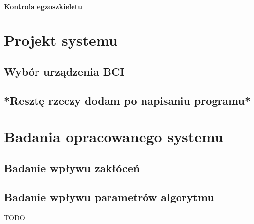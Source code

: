 \documentclass[skorowidz,skroty]{dyplomWEZUT}
\begin{document}
\subsubsection{Kontrola egzoszkieletu}

\chapter{Projekt systemu}
\section{Wybór urządzenia BCI}
\section{*Resztę rzeczy dodam po napisaniu programu*}

\chapter{Badania opracowanego systemu}
\section{Badanie wpływu zakłóceń}
\section{Badanie wpływu parametrów algorytmu}



\begin{zakonczenie}\label{chap:zakonczenie}
TODO
\end{zakonczenie}

\printbibliography[heading=bibintoc]

\listoftables

\listoffigures

\listoflistings


\printindex
\end{document}

